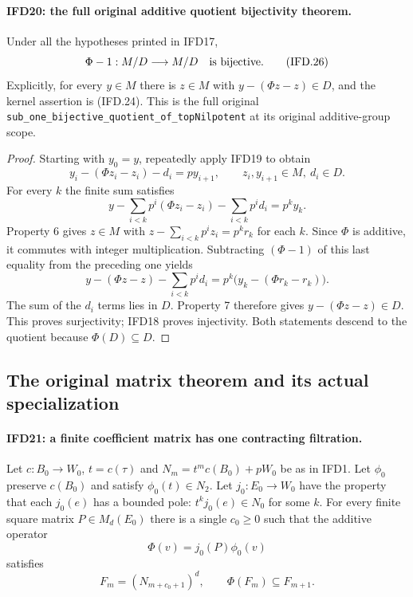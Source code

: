 \paragraph{IFD20: the full original additive quotient bijectivity theorem.}
\label{claim:IFD20}
Under all the hypotheses printed in IFD17,
\[
                         \Phi-1:M/D\longrightarrow M/D
                                      \quad\hbox{is bijective}.       \tag{IFD.26}
\]
Explicitly, for every $y\in M$ there is $z\in M$ with
$y-(\Phi z-z)\in D$, and the kernel assertion is (IFD.24).
This is the full original
\texttt{sub\_one\_bijective\_quotient\_of\_topNilpotent}
at its original additive-group scope.

\begin{proof}
Starting with $y_0=y$, repeatedly apply IFD19 to obtain
\[
                  y_i-(\Phi z_i-z_i)-d_i=p y_{i+1},
                   \qquad z_i,y_{i+1}\in M,\ d_i\in D.
\]
For every $k$ the finite sum satisfies
\[
 y-\sum_{i<k}p^i(\Phi z_i-z_i)-\sum_{i<k}p^id_i=p^ky_k.
\]
Property 6 gives $z\in M$ with
$z-\sum_{i<k}p^iz_i=p^kr_k$ for each $k$.
Since $\Phi$ is additive, it commutes with integer multiplication.
Subtracting $(\Phi-1)$ of this last equality from the preceding
one yields
\[
 y-(\Phi z-z)-\sum_{i<k}p^id_i
                         =p^k\bigl(y_k-(\Phi r_k-r_k)\bigr).
\]
The sum of the $d_i$ terms lies in $D$. Property 7 therefore gives
$y-(\Phi z-z)\in D$. This proves surjectivity; IFD18 proves
injectivity. Both statements descend to the quotient because
$\Phi(D)\subseteq D$.
\end{proof}

\subsection{The original matrix theorem and its actual specialization}

\paragraph{IFD21: a finite coefficient matrix has one contracting filtration.}
\label{claim:IFD21}
Let $c:B_0\to W_0$, $t=c(\tau)$ and $N_m=t^mc(B_0)+pW_0$
be as in IFD1. Let $\phi_0$ preserve $c(B_0)$ and satisfy
$\phi_0(t)\in N_2$. Let $j_0:E_0\to W_0$ have the property
that each $j_0(e)$ has a bounded pole:
$t^kj_0(e)\in N_0$ for some $k$.
For every finite square matrix $P\in M_d(E_0)$ there is a
single $c_0\geq0$ such that the additive operator
\[
                   \Phi(v)=j_0(P)\phi_0(v)
\]
satisfies
\[
 F_m=(N_{m+c_0+1})^d,\qquad \Phi(F_m)\subseteq F_{m+1}.
                                                               \tag{IFD.27}
\]

